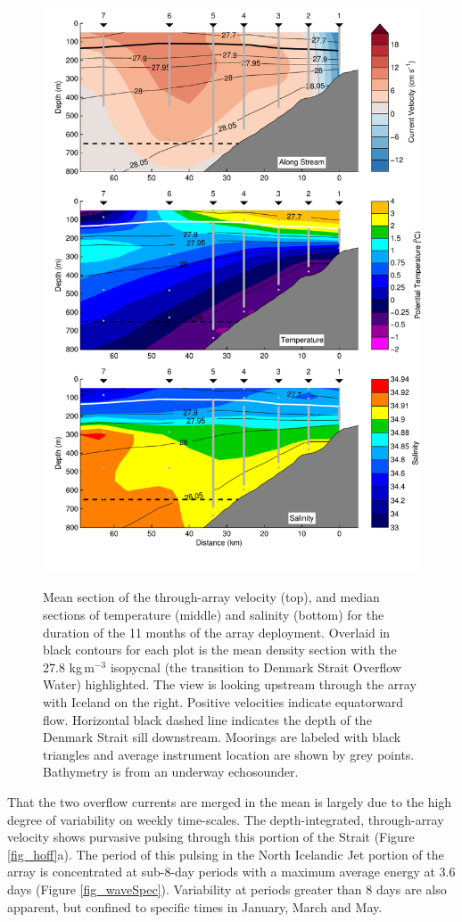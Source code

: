 \documentclass[12pt,titlepage,figuresatend]{article}
\begin{document}
\begin{figure}[p!]
  \centering\includegraphics[width=.9\hsize]{./figures/plot_section.pdf}
  \caption{Mean section of the through-array velocity (top), and median sections of temperature (middle) and salinity (bottom) for the duration of the 11 months of the array deployment. Overlaid in black contours for each plot is the mean density section with the 27.8 kg$\,$m$^{-3}$ isopycnal (the transition to Denmark Strait Overflow Water) highlighted. The view is looking upstream through the array with Iceland on the right. Positive velocities indicate equatorward flow. Horizontal black dashed line indicates the depth of the Denmark Strait sill downstream. Moorings are labeled with black triangles and average instrument location are shown by grey points. Bathymetry is from an underway echosounder.}{\label{fig_section}}
\end{figure}

That the two overflow currents are merged in the mean is largely due to the high degree of variability on weekly time-scales. The depth-integrated, through-array velocity shows purvasive pulsing through this portion of the Strait (Figure \ref{fig_hoff}a). The period of this pulsing in the North Icelandic Jet portion of the array is concentrated at sub-8-day periods with a maximum average energy at 3.6 days (Figure \ref{fig_waveSpec}). Variability at periods greater than 8 days are also apparent, but confined to specific times in January, March and May.
\end{document}
